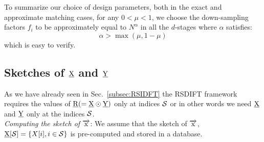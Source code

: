 \begin{enumerate}
To summarize our choice of design parameters, both in the exact and approximate matching cases, for any $0<\mu<1$, we choose the down-sampling factors $f_i$ to be approximately equal to $N^{\alpha}$ in all the $d$-stages where $\alpha$ satisfies:
\begin{equation}
\label{Eqn:IneqMuAlpha}
\alpha>\max(\mu,1-\mu)
\end{equation}
which is easy to verify.

\subsection{Sketches of $\underline{\mathrm{X}}$ and $\underline{\mathrm{Y}}$} 
\label{subsec:skteches}		 
 As we have already seen in Sec.~\ref{subsec:RSIDFT} the RSDIFT framework requires the values of $\underline{\mathrm{R}}(=\underline{\mathrm{X}}\odot \underline{\mathrm{Y}})$ only at indices $\mathcal{S}$ or in other words we need $\underline{\mathrm{X}}$ and $\underline{\mathrm{Y}}$ only at the indices $\mathcal{S}$. \\
% 

\textit{Computing the sketch of $\overrightarrow{\mathrm{x}}$}: We assume that the sketch of $\overrightarrow{\mathrm{x}}$, $ \underline{\mathrm{X}}[\mathcal{S}]= \{X[i],i\in \mathcal{S}\}$ is pre-computed and stored in a database.  \\


\end{enumerate}
